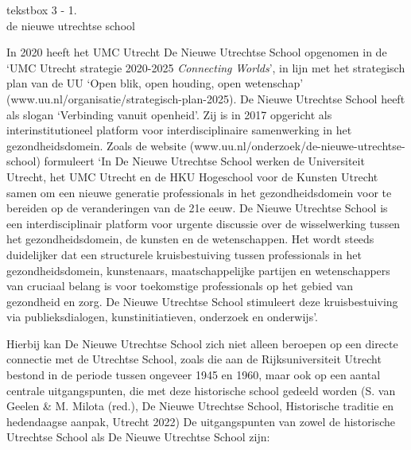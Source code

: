 \documentclass[smallauthor, chapterhaspagenum, nochapterinheader, pagenuminheader,  bigchapnum,medium2, tocpages, garamond, titleinheader]{jote-book}
\begin{document}
	\begin{bookbox}{\raggedright tekstbox 3 - 1. \\de nieuwe utrechtse school}
		In 2020 heeft het UMC Utrecht De Nieuwe Utrechtse School opgenomen in de ‘UMC Utrecht strategie 2020-2025 \emph{Connecting}\emph{ }\emph{Worlds}', in lijn met het strategisch plan van de UU ‘Open blik, open houding, open wetenschap' (www.uu.nl/organisatie/strategisch-plan-2025). De Nieuwe Utrechtse School heeft als slogan ‘Verbinding vanuit openheid'. Zij is in 2017 opgericht als interinstitutioneel platform voor interdisciplinaire samenwerking in het gezondheidsdomein. Zoals de website (www.uu.nl/onderzoek/de-nieuwe-utrechtse-school) formuleert ‘In De Nieuwe Utrechtse School werken de Universiteit Utrecht, het UMC Utrecht en de HKU Hogeschool voor de Kunsten Utrecht samen om een nieuwe generatie professionals in het gezondheidsdomein voor te bereiden op de veranderingen van de 21e eeuw. De Nieuwe Utrechtse School is een interdisciplinair platform voor urgente discussie over de wisselwerking tussen het gezondheidsdomein, de kunsten en de wetenschappen. Het wordt steeds duidelijker dat een structurele kruisbestuiving tussen professionals in het gezondheidsdomein, kunstenaars, maatschappelijke partijen en wetenschappers van cruciaal belang is voor toekomstige professionals op het gebied van gezondheid en zorg. De Nieuwe Utrechtse School stimuleert deze kruisbestuiving via publieksdialogen, kunstinitiatieven, onderzoek en onderwijs'.

		\vspace*{\baselineskip}

		Hierbij kan De Nieuwe Utrechtse School zich niet alleen beroepen op een directe connectie met de Utrechtse School, zoals die aan de Rijksuniversiteit Utrecht bestond in de periode tussen ongeveer 1945 en 1960, maar ook op een aantal centrale uitgangspunten, die met deze historische school gedeeld worden (S. van Geelen \& M. Milota (red.), De Nieuwe Utrechtse School, Historische traditie en hedendaagse aanpak, Utrecht 2022) De uitgangspunten van zowel de historische Utrechtse School als De Nieuwe Utrechtse School zijn:

		\vspace*{\baselineskip}


\end{bookbox}
\end{document}
